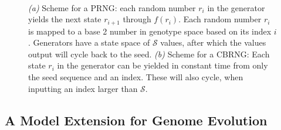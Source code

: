 \documentclass[paper=a4, fontsize=11pt,twoside]{scrartcl}       %
\begin{document}
\begin{figure}[h!]
	\centering
	\\
	\label{rngs}
	\caption{\textit{(a)} Scheme for a PRNG: each random number $r_i$ in the generator yields the next state $r_{i+1}$ through $f(r_i)$. Each random number $r_i$ is mapped to a base 2 number in genotype space based on its index $i$. Generators have a state space of $\mathcal{S}$ values, after which the values output will cycle back to the seed. \textit{(b)} Scheme for a CBRNG: Each state $r_i$ in the generator can be yielded in constant time from only the seed sequence and an index. These will also cycle, when inputting an index larger than $\mathcal{S}$.}
\end{figure}

\subsection*{A Model Extension for Genome Evolution}
\end{document}
